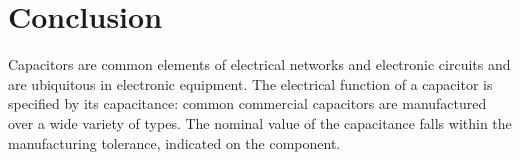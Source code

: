 	\section{Conclusion}
		Capacitors are common elements of electrical networks and electronic circuits and are ubiquitous in electronic equipment. The electrical function of a capacitor is specified by its capacitance: common commercial capacitors are manufactured over a wide variety of types. The nominal value of the capacitance falls within the manufacturing tolerance, indicated on the component.
